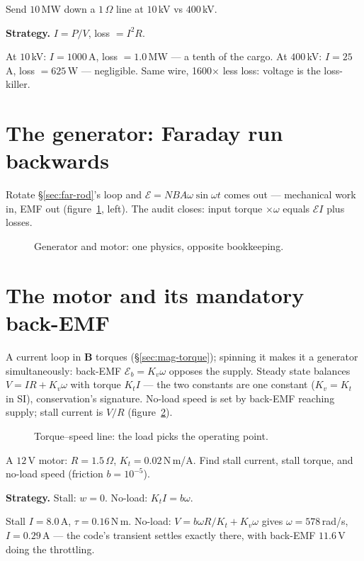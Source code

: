 \begin{example}\label{ex:loss}
Send $10$\,MW down a $1\,\Omega$ line at $10$\,kV vs $400$\,kV.
\par\smallskip
\textbf{Strategy.} $I=P/V$, loss $=I^{2}R$.
\begin{solution}
At $10$\,kV: $I=1000$\,A, loss $=1.0$\,MW --- a tenth of the cargo.
At $400$\,kV: $I=25$\,A, loss $=625$\,W --- negligible. Same wire,
1600$\times$ less loss: voltage is the loss-killer. \checkmark
\end{solution}
\end{example}

\section{The generator: Faraday run backwards}\label{sec:pw-gen}

Rotate \S\ref{sec:far-rod}'s loop and $\mathcal E=NBA\omega\sin\omega t$
comes out --- mechanical work in, EMF out (figure~\ref{fig:genmot},
left). The audit closes: input torque $\times\omega$ equals
$\mathcal EI$ plus losses.

\begin{figure}[htbp]\centering

\caption{Generator and motor: one physics, opposite bookkeeping.}
\label{fig:genmot}
\end{figure}

\section{The motor and its mandatory back-EMF}\label{sec:pw-motor}

A current loop in $\mathbf B$ torques (\S\ref{sec:mag-torque}); spinning
it makes it a generator simultaneously: back-EMF $\mathcal E_b=K_v\omega$
opposes the supply. Steady state balances
$V=IR+K_v\omega$ with torque $K_tI$ --- the two constants are one
constant ($K_v=K_t$ in SI), conservation's signature. No-load speed is
set by back-EMF reaching supply; stall current is $V/R$
(figure~\ref{fig:tspeed}).

\begin{figure}[htbp]\centering

\caption{Torque--speed line: the load picks the operating point.}
\label{fig:tspeed}
\end{figure}

\begin{example}\label{ex:motor}
A $12$\,V motor: $R=1.5\,\Omega$, $K_t=0.02$\,N\,m/A. Find stall
current, stall torque, and no-load speed (friction $b=10^{-5}$).
\par\smallskip
\textbf{Strategy.} Stall: $w=0$. No-load: $K_tI=b\omega$.
\begin{solution}
Stall $I=8.0$\,A, $\tau=0.16$\,N\,m. No-load:
$V=b\omega R/K_t+K_v\omega$ gives $\omega=578$\,rad/s,
$I=0.29$\,A --- the code's transient settles exactly there, with
back-EMF $11.6$\,V doing the throttling. \checkmark
\end{solution}
\end{example}

